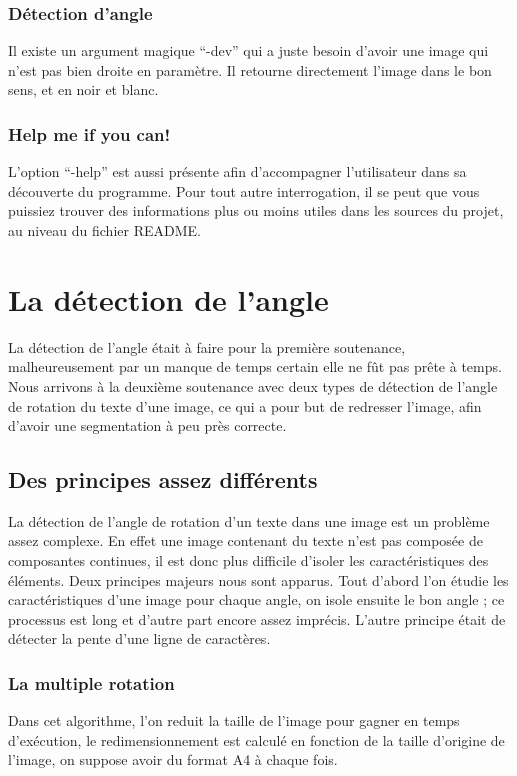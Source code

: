\subsection{ D\'etection d'angle}
 Il existe un argument magique ``-dev'' qui a juste besoin d'avoir une
 image qui n'est pas bien droite en param\`etre. Il retourne directement
 l'image dans le bon sens, et en noir et blanc.
\subsection{ Help me if you can! }
 L'option ``-help'' est aussi pr\'esente afin d'accompagner
 l'utilisateur dans sa d\'ecouverte du programme. Pour tout autre
 interrogation, il se peut que vous puissiez trouver des informations
 plus ou moins utiles dans les sources du projet, au niveau du fichier
 README.


\chapter{ La d\'etection de l'angle }
 La d\'etection de l'angle \'etait \`a faire pour la premi\`ere
 soutenance, malheureusement par un manque de temps certain elle ne f\^ut
 pas pr\^ete \`a temps. Nous arrivons \`a la deuxi\`eme soutenance avec
 deux types de d\'etection de l'angle de rotation du texte d'une image,
 ce qui a pour but de redresser l'image, afin d'avoir une segmentation
 \`a peu pr\`es correcte.

\section{ Des principes assez diff\'erents}
 La d\'etection de l'angle de rotation d'un texte dans une image est un
 probl\`eme assez complexe. En effet une image contenant du texte n'est
 pas compos\'ee de composantes continues, il est donc plus difficile d'isoler
 les caract\'eristiques des \'el\'ements. Deux principes majeurs nous
 sont apparus. Tout d'abord l'on \'etudie les caract\'eristiques d'une
 image pour chaque angle, on isole ensuite le bon angle ; ce
 processus est long et d'autre part encore assez impr\'ecis.
 L'autre principe \'etait de d\'etecter la pente d'une ligne de caract\`eres.
\subsection{ La multiple rotation }
 Dans cet algorithme, l'on reduit la taille de l'image pour gagner en
 temps d'ex\'ecution, le redimensionnement est calcul\'e en fonction de la
 taille d'origine de l'image, on suppose avoir du format A4 \`a chaque
 fois.

